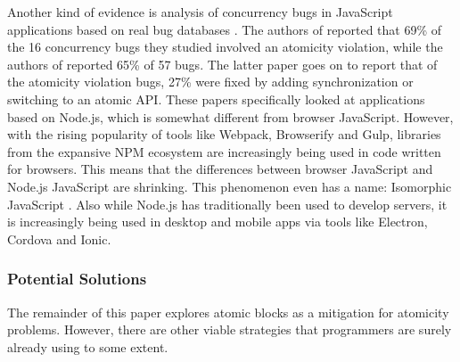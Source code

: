 \documentclass[acmsmall,anonymous,review]{acmart}\settopmatter{printfolios=true,printccs=false,printacmref=false}
\begin{document}

Another kind of evidence is analysis of concurrency bugs in JavaScript applications based on real bug databases \cite{Davis2017, Hong2014, Wang2017}.
The authors of \cite{Davis2017} reported that 69\% of the 16 concurrency bugs they studied involved an atomicity violation, while the authors of \cite{Wang2017} reported 65\% of 57 bugs.
The latter paper goes on to report that of the atomicity violation bugs, 27\% were fixed by adding synchronization or switching to an atomic API.
These papers specifically looked at applications based on Node.js, which is somewhat different from browser JavaScript.
However, with the rising popularity of tools like Webpack, Browserify and Gulp, libraries from the expansive NPM ecosystem are increasingly being used in code written for browsers\footnotemark{}.
This means that the differences between browser JavaScript and Node.js JavaScript are shrinking.
This phenomenon even has a name: Isomorphic JavaScript \cite{Brehm2013}.
Also while Node.js has traditionally been used to develop servers, it is increasingly being used in desktop and mobile apps via tools like Electron, Cordova and Ionic.





\subsubsection{Potential Solutions}

The remainder of this paper explores atomic blocks as a mitigation for atomicity problems.
However, there are other viable strategies that programmers are surely already using to some extent.
\end{document}
